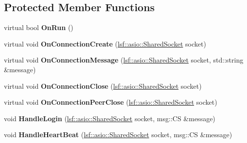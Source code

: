 \subsection*{Protected Member Functions}
\begin{DoxyCompactItemize}
\item 
\hypertarget{classAcceptClientMsgService_a46d790d361ea38d80ea14bf7c8dd1c5d}{
virtual bool {\bfseries OnRun} ()}
\label{classAcceptClientMsgService_a46d790d361ea38d80ea14bf7c8dd1c5d}

\item 
\hypertarget{classAcceptClientMsgService_a2835c346177d114d3a87aed1ab215896}{
virtual void {\bfseries OnConnectionCreate} (\hyperlink{classlsf_1_1asio_1_1SharedSocket}{lsf::asio::SharedSocket} socket)}
\label{classAcceptClientMsgService_a2835c346177d114d3a87aed1ab215896}

\item 
\hypertarget{classAcceptClientMsgService_a2ca50f0618ba914f3270df571cf7e482}{
virtual void {\bfseries OnConnectionMessage} (\hyperlink{classlsf_1_1asio_1_1SharedSocket}{lsf::asio::SharedSocket} socket, std::string \&message)}
\label{classAcceptClientMsgService_a2ca50f0618ba914f3270df571cf7e482}

\item 
\hypertarget{classAcceptClientMsgService_a665a1157d651a69a373e21d258523504}{
virtual void {\bfseries OnConnectionClose} (\hyperlink{classlsf_1_1asio_1_1SharedSocket}{lsf::asio::SharedSocket} socket)}
\label{classAcceptClientMsgService_a665a1157d651a69a373e21d258523504}

\item 
\hypertarget{classAcceptClientMsgService_aa8e600abedff18fbae58a6064e624780}{
virtual void {\bfseries OnConnectionPeerClose} (\hyperlink{classlsf_1_1asio_1_1SharedSocket}{lsf::asio::SharedSocket} socket)}
\label{classAcceptClientMsgService_aa8e600abedff18fbae58a6064e624780}

\item 
\hypertarget{classAcceptClientMsgService_ab2772e5d2ab1c23745e2afef2aad66d8}{
void {\bfseries HandleLogin} (\hyperlink{classlsf_1_1asio_1_1SharedSocket}{lsf::asio::SharedSocket} socket, msg::CS \&message)}
\label{classAcceptClientMsgService_ab2772e5d2ab1c23745e2afef2aad66d8}

\item 
\hypertarget{classAcceptClientMsgService_a0ef8cbb6c48d4f400cf83f4149ec4fb4}{
void {\bfseries HandleHeartBeat} (\hyperlink{classlsf_1_1asio_1_1SharedSocket}{lsf::asio::SharedSocket} socket, msg::CS \&message)}
\label{classAcceptClientMsgService_a0ef8cbb6c48d4f400cf83f4149ec4fb4}


\end{DoxyCompactItemize}
